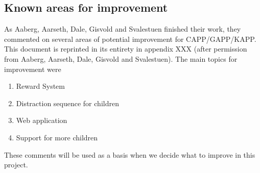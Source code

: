 \subsection{Known areas for improvement}
\label{improvements}
As Aaberg, Aarseth, Dale, Gisvold and Svalestuen finished their work, they commented on several areas of potential improvement for CAPP/GAPP/KAPP. This document is reprinted in its entirety in appendix XXX (after permission from Aaberg, Aarseth, Dale, Gisvold and Svalestuen). The main topics for improvement were
\begin{enumerate}
\item{Reward System}
\item{Distraction sequence for children}
\item{Web application}
\item{Support for more children}
\end{enumerate}

These comments will be used as a basis when we decide what to improve in this project.





